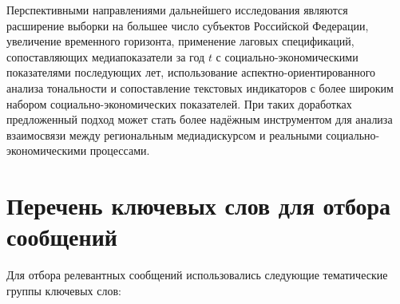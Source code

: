 \documentclass[master, och, coursework]{SCWorks1}
\begin{document}
Перспективными направлениями дальнейшего исследования являются расширение выборки на большее число субъектов Российской Федерации, увеличение временного горизонта, применение лаговых спецификаций, сопоставляющих медиапоказатели за год $t$ с социально-экономическими показателями последующих лет, использование аспектно-ориентированного анализа тональности и сопоставление текстовых индикаторов с более широким набором социально-экономических показателей. При таких доработках предложенный подход может стать более надёжным инструментом для анализа взаимосвязи между региональным медиадискурсом и реальными социально-экономическими процессами.

	
	

\appendix

\section{Перечень ключевых слов для отбора сообщений}
\label{app:keywords}

Для отбора релевантных сообщений использовались следующие тематические группы ключевых слов:
\end{document}
